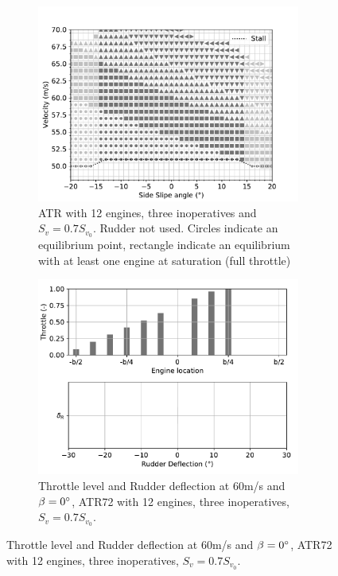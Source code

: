 \begin{figure}[hbt!]
	\centering
	\begin{subfigure}{0.49\textwidth}
		\includegraphics[width=0.95\textwidth]{DEPoriginalMapBetaVelfin07Eng15RudTrue}
		\caption{ATR with 12 engines, three inoperatives and $S_v=0.7S_{v_0}$. Rudder not used. Circles indicate an equilibrium point, rectangle indicate an equilibrium with at least one engine at saturation (full throttle)}
		\label{fig:DEPoriginalfin07_15engine}
	\end{subfigure}
	\begin{subfigure}{0.49\textwidth}
		\includegraphics[width=0.95\textwidth]{DeflDEPoriginalfin07Eng15RudTrue}
		\caption{Throttle level and Rudder deflection at 60m/s and $\beta=0\degree$, ATR72 with 12 engines, three inoperatives, $S_v=0.7S_{v_0}$.}
		\label{fig:DeflDEPoriginalfin07_15Eng}
	\end{subfigure}
\end{figure}

